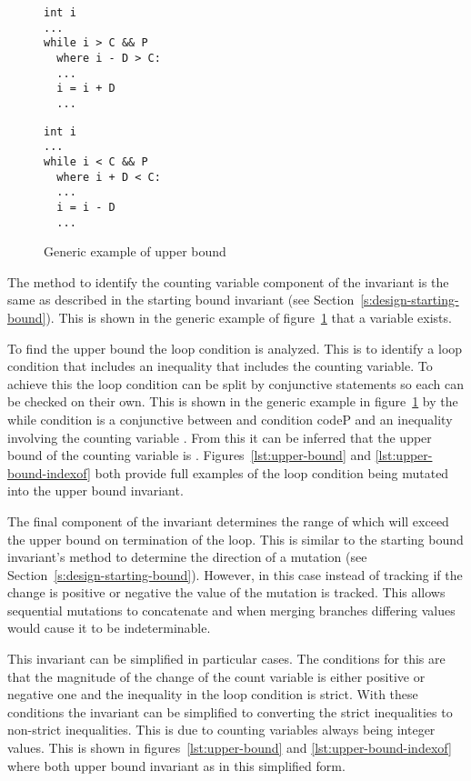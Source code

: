 \begin{figure}[ht]
\noindent
\begin{minipage}{.45\textwidth}
\begin{lstlisting}
int i
...
while i > C && P
  where i - D > C:
  ...
  i = i + D
  ...
\end{lstlisting}
\end{minipage}\hfill
\begin{minipage}{.45\textwidth}
\begin{lstlisting}
int i
...
while i < C && P
  where i + D < C:
  ...
  i = i - D
  ...
\end{lstlisting}
\end{minipage}
\caption{Generic example of upper bound}
\label{lst:upper-bound-gen}
\end{figure}

The method to identify the counting variable component
of the invariant is the same as described in the 
starting bound invariant (see Section~\ref{s:design-starting-bound}).
This is shown in the generic example of figure~\ref{lst:upper-bound-gen}
that a variable  exists.

To find the upper bound the loop condition is analyzed.
This is to identify a loop condition that includes an
inequality that includes the counting variable.
To achieve this the loop condition can be split
by conjunctive statements so each can be checked on their own.
This is shown in the generic example in figure~\ref{lst:upper-bound-gen}
by the while condition is a conjunctive between and condition code{P}
and an inequality involving the counting variable .
From this it can be inferred that the upper bound of the counting 
variable is .
Figures~\ref{lst:upper-bound} and \ref{lst:upper-bound-indexof}
both provide full examples of the loop condition being mutated
into the upper bound invariant.

The final component of the invariant determines the range of 
which  will exceed the upper bound on termination of the
loop.
This is similar to the starting bound invariant's method to 
determine the direction of a mutation (see
Section~\ref{s:design-starting-bound}).
However, in this case instead of tracking if the change is positive or
negative the value of the mutation is tracked.
This allows sequential mutations to concatenate and when merging
branches differing values would cause it to be indeterminable.

This invariant can be simplified in particular cases.
The conditions for this are that the magnitude
of the change of the count variable is either positive or negative one
and the inequality in the loop condition is strict.
With these conditions the invariant can be simplified to converting the
strict inequalities to non-strict inequalities.
This is due to counting variables always being integer values.
This is shown in figures~\ref{lst:upper-bound} and
\ref{lst:upper-bound-indexof} where both upper bound
invariant as in this simplified form.

